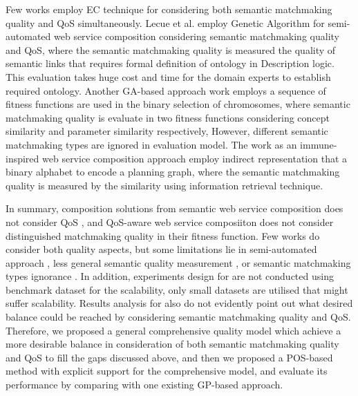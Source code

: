 \documentclass{IEEEtran}
\begin{document}
Few works \cite{lecue2009optimizing,fanjiang2014semantic,pop2009immune} employ EC technique for considering both semantic matchmaking quality and QoS simultaneously. Lecue et al. \cite{lecue2009optimizing} employ Genetic Algorithm for semi-automated web service composition considering semantic matchmaking quality and QoS, where the semantic matchmaking quality is measured the quality of semantic links that requires formal definition of ontology in Description logic. This evaluation takes huge cost and time for the domain experts to establish required ontology. Another GA-based approach work \cite{fanjiang2014semantic} employs a sequence of fitness functions are used in the binary selection of chromosomes, where semantic matchmaking quality is evaluate in two fitness functions considering concept similarity and parameter similarity respectively, However, different semantic matchmaking types are ignored in evaluation model. The work \cite{pop2009immune} as an immune-inspired web service composition approach employ indirect representation that a binary alphabet to encode a planning graph, where the semantic matchmaking quality is measured  by the similarity using information retrieval technique.


In summary, composition solutions from semantic web service composition does not consider QoS \cite{boustil2014semantic,mier2015integrated, bansal2016generalized}, and QoS-aware web service composiiton \cite{da2016particle,da2015graphevol,yu2013adaptive, gupta2015optimization,qi2010combining,ma2015hybrid} does not consider distinguished matchmaking quality in their fitness function. Few works do consider both quality aspects, but some limitations lie in semi-automated approach \cite{lecue2009optimizing}, less general semantic quality measurement \cite{lecue2009optimizing, pop2009immune}, or semantic matchmaking types ignorance \cite{pop2009immune}. In addition, experiments design for  \cite{lecue2009optimizing,fanjiang2014semantic,pop2009immune} are not conducted using benchmark dataset for the scalability, only small datasets are utilised that might suffer scalability. Results analysis for \cite{lecue2009optimizing,fanjiang2014semantic,pop2009immune} also do not evidently point out what desired balance could be reached by considering semantic matchmaking quality and QoS. Therefore, we proposed a general comprehensive quality model which achieve a more desirable balance in consideration of both semantic matchmaking quality and QoS to fill the gaps discussed above, and then we proposed a POS-based method with explicit support for the comprehensive model, and evaluate its performance by comparing with one existing GP-based approach.
\end{document}
